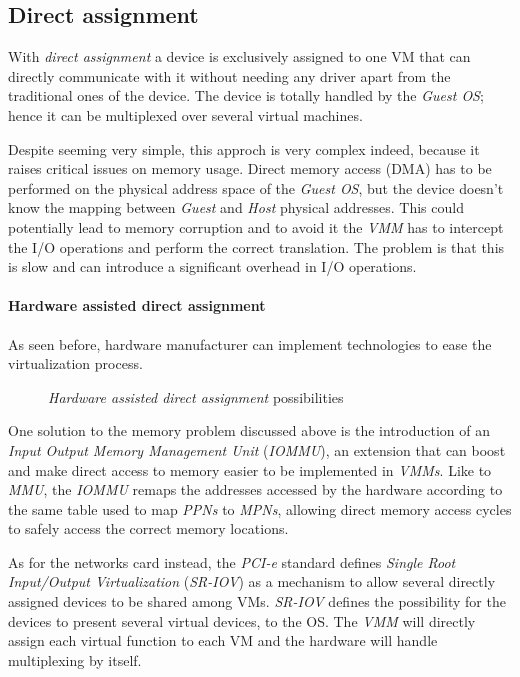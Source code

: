 \subsection{Direct assignment}
With \emph{direct assignment} a device is exclusively assigned to one VM that
can directly communicate with it without needing any driver apart from the
traditional ones of the device. The device is totally handled by the \emph{Guest
OS}; hence it can be multiplexed over several virtual machines.

Despite seeming very simple, this approch is very complex indeed, because it
raises critical issues on memory usage. Direct memory access (DMA) has to be
performed on the physical address space of the \emph{Guest OS}, but the device
doesn't know the mapping between \emph{Guest} and \emph{Host} physical addresses.
This could potentially lead to memory corruption and to avoid it the \emph{VMM}
has to intercept the I/O operations and perform the correct translation. The
problem is that this is slow and can introduce a significant overhead in I/O
operations.

\paragraph{Hardware assisted direct assignment}
As seen before, hardware manufacturer can implement technologies to ease the
virtualization process.

\begin{figure}[ht!]
    \centering
    \hspace{2cm}
    \caption{\emph{Hardware assisted direct assignment} possibilities}
\end{figure}

\noindent
One solution to the memory problem discussed above
is the introduction of an \emph{Input Output Memory Management Unit}
(\emph{IOMMU}), an extension that can boost and make direct access to memory
easier to be implemented in \emph{VMMs}. Like to \emph{MMU}, the \emph{IOMMU}
remaps the addresses accessed by the hardware according to the same table used
to map \emph{PPNs} to \emph{MPNs}, allowing direct memory access cycles to
safely access the correct memory locations.

As for the networks card instead, the \emph{PCI-e} standard defines
\emph{Single Root Input/Output Virtualization} (\emph{SR-IOV}) as a mechanism
to allow several directly assigned devices to be shared among VMs. \emph{SR-IOV}
defines the possibility for the devices to present several virtual devices,
 to the OS. The \emph{VMM} will directly assign each
virtual function to each VM and the hardware will handle multiplexing by
itself.

